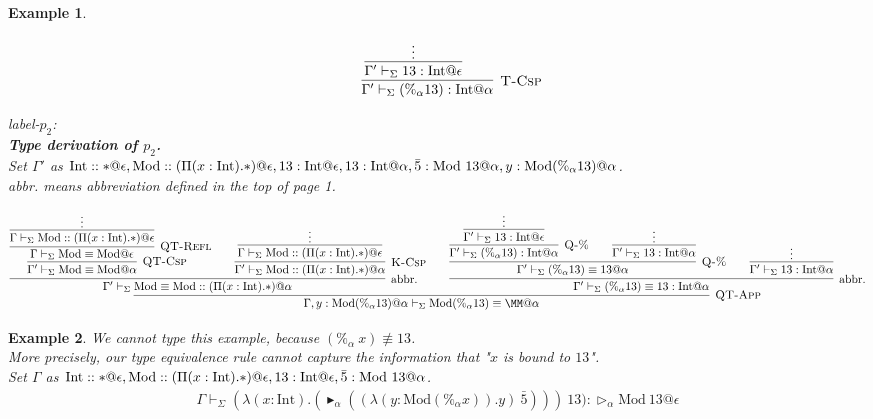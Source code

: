 \documentclass[9pt, a4paper]{extarticle}
\theoremstyle{break}
\newtheorem{ex}{Example}
\newcommand{\G}{\Gamma}
\newcommand{\V}{\vdash_\Sigma}
\newcommand{\TW}{\triangleright}
\newcommand{\TB}{\blacktriangleright}
\newcommand{\E}{\equiv}
\begin{document}
\begin{ex}
\begin{center}
$${{{						}
						\andalso
						\infer[\textsc{T-Csp}]
						{\G'\V (\%_\alpha 13):\I@\alpha}
						{
							\infer[]
							{\G'\V 13:\I@\epsilon}
							{\vdots}
							\andalso
						}
					}
				}
			$$
		\end{center}
		label-$p_2$:\\
		{\bf{Type derivation of $p_2$}.}\\
		Set $\G'$ as $\I::*@\epsilon,\M::(\Pi (x:\I).*)@\epsilon,13:\I@\epsilon,13:\I@\alpha,\bar{5}:\M\ 13@\alpha,y:\M (\%_\alpha 13)@\alpha$.\\
		abbr. means abbreviation defined in the top of page 1.
		\begin{center}
			$$
				\infer[\textsc{QT-App}]
				{\G,y:\M (\%_\alpha 13)@\alpha \V \M (\%_\alpha 13)\E\MM@\alpha}
				{
					\infer[\textrm{abbr.}]
					{\G' \V \M\E\M::(\Pi (x:\I).*)@\alpha}
					{
						\infer[\textsc{QT-Csp}]
						{\G' \V \M\E\M@\alpha}
						{
							\infer[\textsc{QT-Refl}]
							{\G\V \M\E\M@\epsilon}
							{
								\infer[]
								{\G\V \M::(\Pi (x:\I).*)@\epsilon}
								{
									\vdots
								}
							}
						}
						\andalso
						\infer[\textsc{K-Csp}]
						{\G' \V \M::(\Pi (x:\I).*)@\alpha}
						{
							\infer[]
							{\G \V\M::(\Pi (x:\I).*)@\epsilon}
							{\vdots}
						}
					}
					\andalso
					\infer[\textrm{abbr.}]
					{\G' \V (\%_\alpha 13)\E 13:\I@\alpha}
					{
						\infer[\textsc{Q-\%}]
							{\G' \V (\%_\alpha 13)\E 13@\alpha}
							{
								\infer[\textsc{Q-\%}]
							{\G' \V (\%_\alpha 13):\I@\alpha}
							{
								\infer[]
								{\G' \V 13:\I@\epsilon}
								{\vdots}
							}
								\andalso
								\infer[]
								{\G' \V 13:\I@\alpha}
								{\vdots}
							}
						\andalso
						\infer[]
							{\G' \V 13:\I@\alpha}
							{\vdots}
					}
				}
			$$
		\end{center}
	\end{ex}

	\begin{ex}
		\newcommand{\M}{\textrm{Mod}}
		\newcommand{\I}{\textrm{Int}}
		\newcommand{\GF}{\textrm{GF}}
		We cannot type this example, because $(\%_\alpha\ x) \not\E 13$.\\
		More precisely, our type equivalence rule cannot capture the information that "$x$ is bound to $13$".\\

		Set $\G$ as $\I::*@\epsilon,\M::(\Pi (x:\I).*)@\epsilon,13:\I@\epsilon,\bar{5}:\M\ 13@\alpha$.
		\begin{align*}
			\G\V
			(\lambda (x:\I).
			(\TB_\alpha ((\lambda (y:\M (\%_\alpha x)).y)\ \bar{5})))\ 13):\TW_\alpha \M\ 13@\epsilon
		\end{align*}
	\end{ex}
\end{document}

